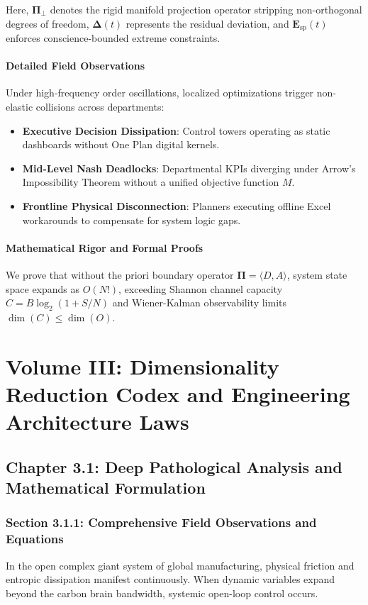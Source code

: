 \documentclass[12pt,a4paper,oneside]{book}
\begin{document}
Here, $\mathbf{\Pi}_{\bot}$ denotes the rigid manifold projection operator stripping non-orthogonal degrees of freedom, $\mathbf{\Delta}(t)$ represents the residual deviation, and $\mathbf{E}_{\mathrm{sp}}(t)$ enforces conscience-bounded extreme constraints.

\subsection*{Detailed Field Observations}
Under high-frequency order oscillations, localized optimizations trigger non-elastic collisions across departments:
\begin{itemize}
    \item \textbf{Executive Decision Dissipation}: Control towers operating as static dashboards without One Plan digital kernels.
    \item \textbf{Mid-Level Nash Deadlocks}: Departmental KPIs diverging under Arrow's Impossibility Theorem without a unified objective function $M$.
    \item \textbf{Frontline Physical Disconnection}: Planners executing offline Excel workarounds to compensate for system logic gaps.
\end{itemize}

\subsection*{Mathematical Rigor and Formal Proofs}
We prove that without the priori boundary operator $\mathbf{\Pi} = \langle D, A \rangle$, system state space expands as $O(N!)$, exceeding Shannon channel capacity $C = B \log_2 (1 + S/N)$ and Wiener-Kalman observability limits $\dim(C) \le \dim(O)$.
\clearpage
\part{Volume III: Dimensionality Reduction Codex and Engineering Architecture Laws}
\chapter{Chapter 3.1: Deep Pathological Analysis and Mathematical Formulation}
\section{Section 3.1.1: Comprehensive Field Observations and Equations}

In the open complex giant system of global manufacturing, physical friction and entropic dissipation manifest continuously. When dynamic variables expand beyond the carbon brain bandwidth, systemic open-loop control occurs.
\end{document}
